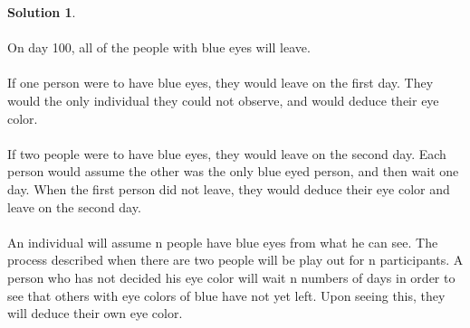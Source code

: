 \documentclass{article}
\theoremstyle{definition}
\newtheorem*{solution}{Solution}
\begin{document}
\begin{solution}\ \\
\ \\
On day 100, all of the people with blue eyes will leave.\ \\
\ \\
If one person were to have blue eyes, they would leave on the first day. They would the only individual they could not observe, and would deduce their eye color.\ \\
\ \\
If two people were to have blue eyes, they would leave on the second day. Each person would assume the other was the only blue eyed person, and then wait one day. When the first person did not leave, they would deduce their eye color and leave on the second day.\ \\
\ \\
An individual will assume n people have blue eyes from what he can see. The process described when there are two people will be play out for n participants. A person who has not decided his eye color will wait n numbers of days in order to see that others with eye colors of blue have not yet left. Upon seeing this, they will deduce their own eye color.
\end{solution}
\end{document}
